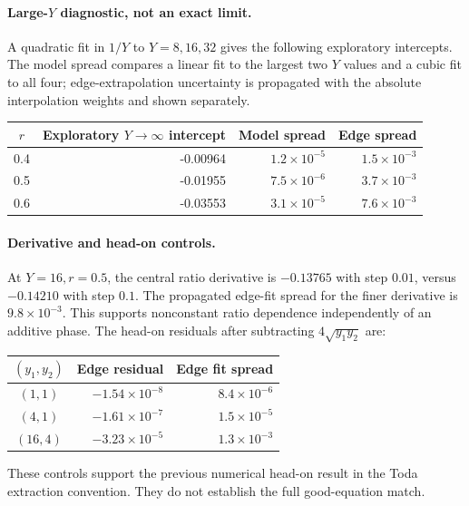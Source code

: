 \paragraph{Large-$Y$ diagnostic, not an exact limit.}
A quadratic fit in $1/Y$ to $Y=8,16,32$ gives the following exploratory
intercepts. The model spread compares a linear fit to the largest two
$Y$ values and a cubic fit to all four; edge-extrapolation uncertainty
is propagated with the absolute interpolation weights and shown separately.
\begin{center}\small\begin{tabular}{@{}crrr@{}}\toprule
$r$ & Exploratory $Y\to\infty$ intercept & Model spread & Edge spread\\\midrule
0.4 & -0.00964 & $1.2\times10^{-5}$ & $1.5\times10^{-3}$\\
0.5 & -0.01955 & $7.5\times10^{-6}$ & $3.7\times10^{-3}$\\
0.6 & -0.03553 & $3.1\times10^{-5}$ & $7.6\times10^{-3}$\\
\bottomrule\end{tabular}\end{center}
\paragraph{Derivative and head-on controls.}
At $Y=16,r=0.5$, the central ratio derivative is $-0.13765$ with step $0.01$, versus $-0.14210$ with step $0.1$.
The propagated edge-fit spread for the finer derivative is $9.8\times10^{-3}$.
This supports nonconstant ratio dependence independently of an additive phase.
The head-on residuals after subtracting $4\sqrt{y_1y_2}$ are:
\begin{center}\small\begin{tabular}{@{}crr@{}}\toprule
$(y_1,y_2)$ & Edge residual & Edge fit spread\\\midrule
$(1,1)$ & $-1.54\times10^{-8}$ & $8.4\times10^{-6}$\\
$(4,1)$ & $-1.61\times10^{-7}$ & $1.5\times10^{-5}$\\
$(16,4)$ & $-3.23\times10^{-5}$ & $1.3\times10^{-3}$\\
\bottomrule\end{tabular}\end{center}
These controls support the previous numerical head-on result in the
Toda extraction convention. They do not establish the full good-equation match.
